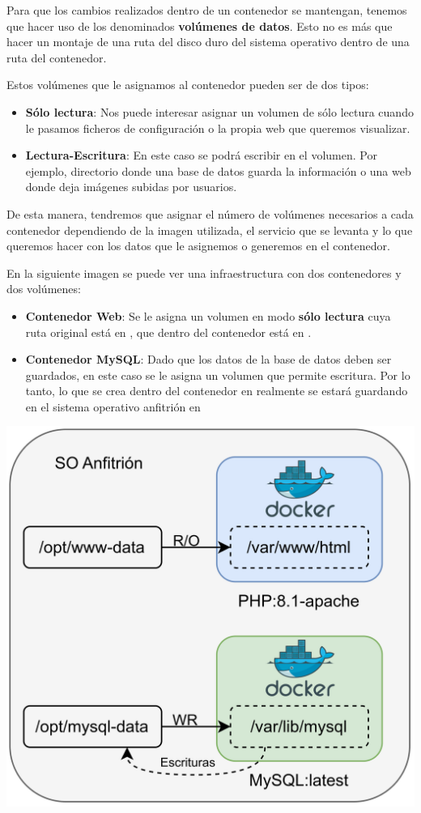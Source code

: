 Para que los cambios realizados dentro de un contenedor se mantengan, tenemos que hacer uso de los denominados \textbf{volúmenes de datos}. Esto no es más que hacer un montaje de una ruta del disco duro del sistema operativo dentro de una ruta del contenedor.


Estos volúmenes que le asignamos al contenedor pueden ser de dos tipos:
\begin{itemize}
    \item \textbf{Sólo lectura}: Nos puede interesar asignar un volumen de sólo lectura cuando le pasamos ficheros de configuración o la propia web que queremos visualizar.
    \item \textbf{Lectura-Escritura}: En este caso se podrá escribir en el volumen. Por ejemplo, directorio donde una base de datos guarda la información o una web donde deja imágenes subidas por usuarios.
\end{itemize}

De esta manera, tendremos que asignar el número de volúmenes necesarios a cada contenedor dependiendo de la imagen utilizada, el servicio que se levanta y lo que queremos hacer con los datos que le asignemos o generemos en el contenedor.

En la siguiente imagen se puede ver una infraestructura con dos contenedores y dos volúmenes:
\begin{itemize}
    \item \textbf{Contenedor Web}: Se le asigna un volumen en modo \textbf{sólo lectura} cuya ruta original está en , que dentro del contenedor está en .
    \item \textbf{Contenedor MySQL}: Dado que los datos de la base de datos deben ser guardados, en este caso se le asigna un volumen que permite escritura. Por lo tanto, lo que se crea dentro del contenedor en  realmente se estará guardando en el sistema operativo anfitrión en 
\end{itemize}
\begin{center}
    \includegraphics[width=0.65\linewidth]{img/docker/volumes.png}
\end{center}

